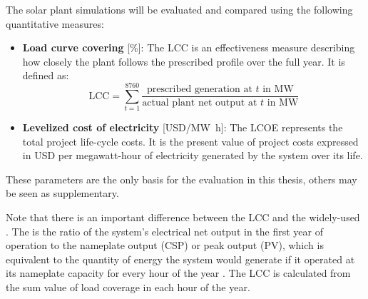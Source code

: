 
The solar plant simulations will be evaluated and compared using the following quantitative measures:
\begin{itemize}
\item \textbf{Load curve covering} [\si{\percent}]: The \ac{LCC} is an effectiveness measure describing how closely the plant follows the prescribed profile over the full year. It is defined as:
\begin{equation}
\mbox{LCC} = \sum\limits_{t=1}^{8760} \frac{\mbox{prescribed generation at }t\mbox{ in MW}}{\mbox{actual plant net output at }t\mbox{ in MW}} \label{GL_GCC}
\end{equation} 
\item \textbf{Levelized cost of electricity} [USD/\si{\mega\watt\hour}]: The \acf{LCOE} represents the total project life-cycle costs. It is the present value of project costs expressed in USD per megawatt-hour of electricity generated by the system over its life.
\end{itemize}

These parameters are the only basis for the evaluation in this thesis, others may be seen as supplementary. 


Note that there is an important difference between the \ac{LCC} and the widely-used . The  is the ratio of the system's electrical net output in the first year of operation to the nameplate output (\ac{CSP}) or peak output (\ac{PV}), which is equivalent to the quantity of energy the system would generate if it operated at its nameplate capacity for every hour of the year \cite{NREL2015a}. The \ac{LCC} is calculated from the sum value of load coverage in each hour of the year. 
